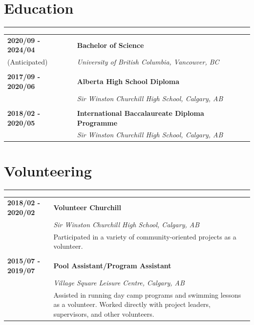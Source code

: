 \documentclass[letterpaper]{article}
\newcommand{\horizontalLine}{%
    \rule{\textwidth}{0.2pt}
    \vspace{1ex}
}
\begin{document}
    \section*{Education}

        \horizontalLine

        \begin{tabular}{p{} p{}} 
            \textbf{2020/09 - 2024/04} & \large\textbf{Bachelor of Science} \\
            (Anticipated) & \emph{University of British Columbia, Vancouver, BC} \\
            \\
            \textbf{2017/09 - 2020/06} & \large\textbf{Alberta High School Diploma} \\
            & \emph{Sir Winston Churchill High School, Calgary, AB} \\
            \\
            \textbf{2018/02 - 2020/05} & \large\textbf{International Baccalaureate Diploma Programme} \\
            & \emph{Sir Winston Churchill High School, Calgary, AB} \\
        \end{tabular}

    \section*{Volunteering}

        \horizontalLine

        \begin{tabular}{p{} p{}} 
            \textbf{2018/02 - 2020/02} & \large\textbf{Volunteer Churchill} \\
            & \emph{Sir Winston Churchill High School, Calgary, AB} \\
            & Participated in a variety of community-oriented projects as a volunteer. \\
            \\
            \textbf{2015/07 - 2019/07} & \large\textbf{Pool Assistant/Program Assistant} \\
            & \emph{Village Square Leisure Centre, Calgary, AB} \\
            & Assisted in running day camp programs and swimming lessons as a volunteer.
            Worked directly with project leaders, supervisors, and other volunteers. \\
        \end{tabular}
\end{document}
